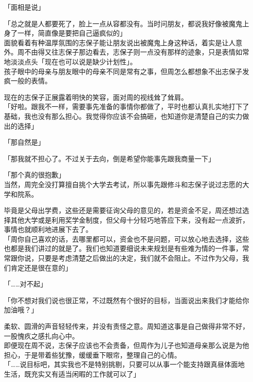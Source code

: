 「面相是说」

「总之就是人都要死了，脸上一点从容都没有。当时问朋友，都说我好像被魔鬼上身了一样，简直像是要把自己逼疯似的」\\

面貌看着有种温厚氛围的志保子能让朋友说出被魔鬼上身这种话，着实是让人意外。周不由得又往志保子那边看去，志保子则一点没有那样的迹象，只是表情如常地淡淡点头「现在也可以说是缺少计划性」。\\

孩子眼中的母亲与朋友眼中的母亲不同是常有之事，但周怎么都想象不出志保子发疯一般的表情。

现在的志保子正展露着明快的笑容，面对周的视线耸了耸肩。\\

「好啦。跟我不一样，需要事先准备的事情你都做了，平时也都认真扎实地打下了基础，我也没有那么担心。我觉得你应该不会搞砸，也知道你是清楚自己的实力做出的选择」

「那自然是」

「那我就不担心了。不过关于去向，倒是希望你能事先跟我商量一下」

「那个真的很抱歉」\\

当然，周完全没打算擅自挑个大学去考试，所以事先跟修斗和志保子说过志愿的大学和院系。

毕竟是父母出学费，这些还是需要征询父母的意见的，若是资金不足，周还想过选择其他大学或是利用奖学金制度，但父母十分轻巧地答应下来，没有起一点波折，事情也就顺利地进展下去了。\\

「周你自己喜欢的话，去哪里都可以，资金也不是问题，可以放心地去选择，这些也都是我们讲过的就是了。我们也知道要细说未来规划是有些难为情的一件事，常常跟你说，只要是考虑清楚之后做出的决定，我们就不会阻止。不过作为父母，我们肯定还是很在意的」

「……对不起」

「你不想对我们说也很正常，不过既然有个很好的目标，当面说出来我们才能给你加油哦？」

柔软、圆滑的声音轻轻传来，并没有责怪之意。周知道这事是自己做得非常不好，一股愧疚之感扎向心中。\\

即便现在周不说，志保子应该也不会责备，但周作为儿子也知道母亲那么说是为他担心，于是带着些犹豫，缓缓垂下眼帘，整理自己的心情。\\

「……说目标吧，其实我也不是特别挑剔，只要可以从事一个能支持跟真昼体面地生活，既充实又有适当闲暇的工作就可以了」\\

